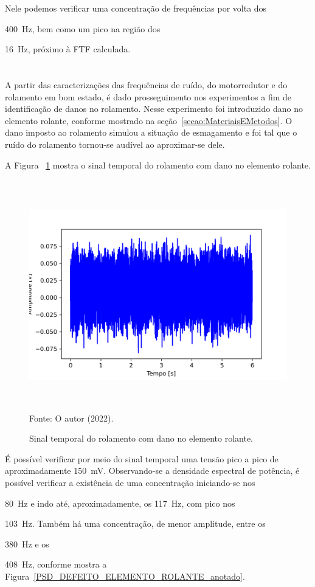\documentclass[
	12pt,				
	oneside,			
	a4paper,			
	english,			
	brazil,			
	]{abntex2ppgsi}
\begin{document}
{{{{{{{{{{{{{Nele podemos verificar uma concentração de frequências por volta dos {\SI{400}{\hertz}, bem como um pico na região dos {\SI{16}{\hertz}, próximo à FTF calculada.

\newpage
\section{}

A partir das caracterizações das frequências de ruído, do motorredutor e do rolamento em bom estado, é dado prosseguimento nos experimentos a fim de identificação de danos no rolamento. Nesse experimento foi introduzido dano no elemento rolante, conforme mostrado na seção~\ref{secao:MateriaisEMetodos}. O dano imposto ao rolamento simulou a situação de esmagamento e foi tal que o ruído do rolamento tornou-se audível ao aproximar-se dele. 

A Figura ~\ref{DEFEITO_ELEMENTO_ROLANTE} mostra o sinal temporal do rolamento com dano no elemento rolante. 

\begin{figure}[H]
\centering
\caption {Sinal temporal do rolamento com dano no elemento rolante.}
\includegraphics[width=\textwidth,height=100mm,keepaspectratio]{GraficosAnalise/DEFEITO_ELEMENTO_ROLANTE} \\
Fonte: O autor (2022).
\label{DEFEITO_ELEMENTO_ROLANTE}
\end{figure} 

É possível verificar por meio do sinal temporal uma tensão pico a pico de aproximadamente {\SI{150}{\milli\volt}}. Observando-se a densidade espectral de potência, é possível verificar a existência de uma concentração iniciando-se nos {\SI{80}{\hertz} e indo até, aproximadamente, os {\SI{117}{\hertz}}, com pico nos {\SI{103}{\hertz}. Também há uma concentração, de menor amplitude, entre os {\SI{380}{\hertz} e os {\SI{408}{\hertz}, conforme mostra a Figura~\ref{PSD_DEFEITO_ELEMENTO_ROLANTE_anotado}. 

}}}}}}}}}}}}}}}}}}}
\end{document}
